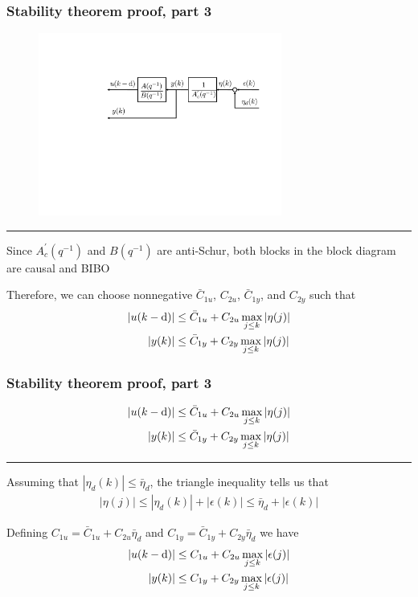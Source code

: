 \begin{frame}
    \frametitle{Stability theorem proof, part 3}

    \begin{figure}
        \includegraphics[width=8cm]{figs_bounded}\\
    \end{figure}
    \hrule{\hfill}
    
    Since $A_c^{'}(q^{-1})$ and $B(q^{-1})$ are anti-Schur, both blocks in the block diagram are causal and BIBO
    \pause
    
    Therefore, we can choose nonnegative $\bar{C}_{1u}$, $C_{2u}$, $\bar{C}_{1y}$, and $C_{2y}$ such that
    \begin{align*}
        |u(k-\textrm{d})| & \leq \bar{C}_{1u} + C_{2u} \max_{j \leq k} |\eta(j)| \\
        |y(k)| & \leq \bar{C}_{1y} + C_{2y} \max_{j \leq k} |\eta(j)|
    \end{align*}

\end{frame}

\begin{frame}
    \frametitle{Stability theorem proof, part 3}

    \begin{align*}
        |u(k-\textrm{d})| & \leq \bar{C}_{1u} + C_{2u} \max_{j \leq k} |\eta(j)| \\
        |y(k)| & \leq \bar{C}_{1y} + C_{2y} \max_{j \leq k} |\eta(j)|
    \end{align*}
    \hrule{\hfill}
    
    Assuming that $|\eta_d(k)| \leq \bar{\eta}_d$, the triangle inequality tells us that 
    \begin{align*}
        |\eta(j)| \leq |\eta_d(k)| + |\epsilon(k)| \leq \bar{\eta}_d + |\epsilon(k)|
    \end{align*}
    \paused
    
    Defining $C_{1u} = \bar{C}_{1u} + C_{2u} \bar{\eta}_d$ and $C_{1y} = \bar{C}_{1y} + C_{2y} \bar{\eta}_d$ we have
    \begin{align*}
        |u(k-\textrm{d})| & \leq C_{1u} + C_{2u} \max_{j \leq k} |\epsilon(j)| \\
        |y(k)| & \leq C_{1y} + C_{2y} \max_{j \leq k} |\epsilon(j)|
    \end{align*}

\end{frame}

